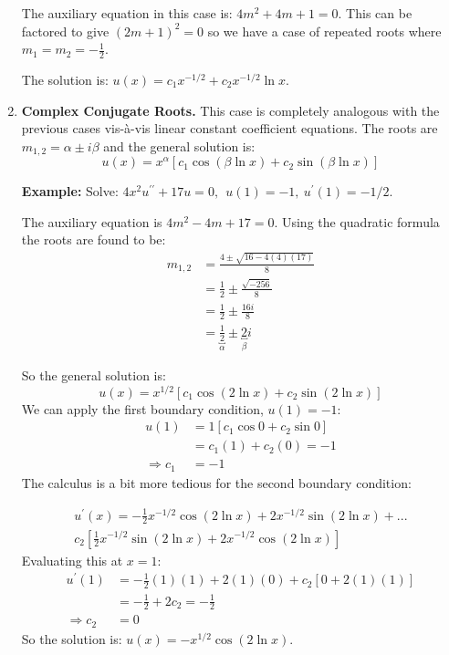 \begin{enumerate}
\vspace{0.25cm}

\noindent The auxiliary equation in this case is: $4m^2+4m+1=0$.  This can be factored to give $(2m+1)^2=0$ so we have a case of repeated roots where $m_1=m_2=-\frac{1}{2}$.

The solution is: $u(x)=c_1x^{-1/2}+c_2x^{-1/2}\ln{x}$.

\vspace{0.5cm}

\item \textbf{Complex Conjugate Roots.}  This case is completely analogous with the previous cases vis-\`a-vis linear constant coefficient equations.  The roots are $m_{1,2} = \alpha \pm i\beta$ and the general solution is:
\begin{equation}
u(x) = x^{\alpha}\left[c_1 \cos{(\beta \ln{x})} + c_2 \sin{(\beta \ln{x})} \right]
\end{equation}

\vspace{0.5cm}

\noindent\textbf{Example:} Solve: $4x^2 u^{\prime \prime} +17u=0, \ \ u(1)=-1, \ u^{\prime}(1)=-1/2$.

\vspace{0.25cm}

\noindent The auxiliary equation is $4m^2-4m+17=0$.  Using the quadratic formula the roots are found to be: 
\begin{align*}
m_{1,2} &= \frac{4 \pm \sqrt{16-4(4)(17)}}{8} \\
&=\frac{1}{2} \pm \frac{\sqrt{-256}}{8} \\
&=\frac{1}{2} \pm \frac{16i}{8} \\
&=\underbracket{\frac{1}{2}}_{\alpha} \pm \underbracket{2}_{\beta}i
\end{align*}

\noindent So the general solution is:
\begin{equation*}
u(x)=x^{1/2}\left[c_1 \cos{(2 \ln{x})}+c_2 \sin{(2 \ln{x})} \right]
\end{equation*}
We can apply the first boundary condition, $u(1)=-1$:
\begin{align*}
u(1) &= 1 \left[c_1 \cos{0} + c_2 \sin{0} \right] \\
&= c_1(1) + c_2(0) = -1 \\
\Rightarrow c_1&=-1
\end{align*}
The calculus is a bit more tedious for the second boundary condition:

\begin{multline*}
u^{\prime}(x) = -\frac{1}{2}x^{-1/2}\cos{(2 \ln{x})} + 2x^{-1/2}\sin{(2 \ln{x})} + ...\\
c_2\left[ \frac{1}{2} x^{-1/2} \sin{(2 \ln{x})} + 2x^{-1/2}\cos{(2 \ln{x})} \right]
\end{multline*}
Evaluating this at $x=1$:
\begin{align*}
u^{\prime}(1)&=-\frac{1}{2}(1)(1)+2(1)(0)+c_2[0+2(1)(1)] \\
&=-\frac{1}{2}+2c_2 = -\frac{1}{2} \\
\Rightarrow c_2&=0
\end{align*}
So the solution is: $u(x) = -x^{1/2}\cos{(2 \ln{x})}$.


\end{enumerate}
